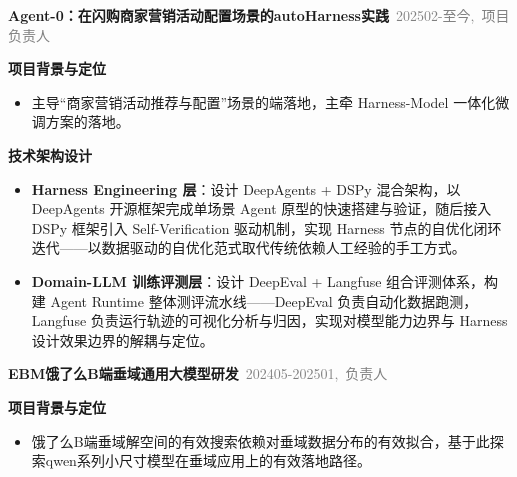 \documentclass{resume}
\newenvironment{graybox}{%
  \begin{mdframed}[backgroundcolor=lightgray,linewidth=0pt,innerleftmargin=8pt,innerrightmargin=8pt,innertopmargin=6pt,innerbottommargin=6pt]
}{%
  \end{mdframed}
}
\begin{document}
\begin{graybox}

\vspace{0.5em}
\noindent{\color{gray!40}\rule{\textwidth}{0.2pt}}
\textbf{Agent-0：在闪购商家营销活动配置场景的autoHarness实践}\ {\small\textcolor{gray}{\hfill 202502-至今,\ 项目负责人}}

\vspace{0.3em}
{\small\textbf{项目背景与定位}}
\begin{onehalfspacing}
\begin{itemize}
  \item 主导“商家营销活动推荐与配置”场景的端落地，主牵 Harness-Model 一体化微调方案的落地。
\end{itemize}
\end{onehalfspacing}

\vspace{0.3em}
{\small\textbf{技术架构设计}}
\begin{onehalfspacing}
\begin{itemize}
  \item \textbf{Harness Engineering 层}：设计 DeepAgents + DSPy 混合架构，以 DeepAgents 开源框架完成单场景 Agent 原型的快速搭建与验证，随后接入 DSPy 框架引入 Self-Verification 驱动机制，实现 Harness 节点的自优化闭环迭代——以数据驱动的自优化范式取代传统依赖人工经验的手工方式。
  \item \textbf{Domain-LLM 训练评测层}：设计 DeepEval + Langfuse 组合评测体系，构建 Agent Runtime 整体测评流水线——DeepEval 负责自动化数据跑测，Langfuse 负责运行轨迹的可视化分析与归因，实现对模型能力边界与 Harness 设计效果边界的解耦与定位。
\end{itemize}
\end{onehalfspacing}

\vspace{0.5em}
\noindent{\color{gray!40}\rule{\textwidth}{0.2pt}}
\textbf{EBM饿了么B端垂域通用大模型研发}\ {\small\textcolor{gray}{\hfill 202405-202501,\ 负责人}}

\vspace{0.3em}
{\small\textbf{项目背景与定位}}
\begin{onehalfspacing}
\begin{itemize}
  \item 饿了么B端垂域解空间的有效搜索依赖对垂域数据分布的有效拟合，基于此探索qwen系列小尺寸模型在垂域应用上的有效落地路径。
\end{itemize}
\end{onehalfspacing}


\end{graybox}
\end{document}
